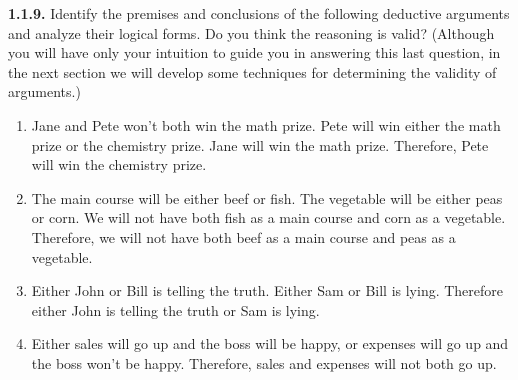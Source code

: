 \documentclass[12pt]{amsart}
\newenvironment{statement}[1]{\smallskip\noindent\color[rgb]{.6627, .3529, .6314} {\bf #1.}}{}
\theoremstyle{definition}
\theoremstyle{remark}
\begin{document}
\begin{statement}{1.1.9}
Identify the premises and conclusions of the following deductive arguments and analyze their logical forms.
Do you think the reasoning is valid?
(Although you will have only your intuition to guide you in answering this last question, in the next section we will develop some techniques for determining the validity of arguments.)
\begin{enumerate}
	\item Jane and Pete won't both win the math prize.
	Pete will win either the math prize or the chemistry prize.
	Jane will win the math prize.
	Therefore, Pete will win the chemistry prize.
	
	\item The main course will be either beef or fish.
	The vegetable will be either peas or corn.
	We will not have both fish as a main course and corn as a vegetable.
	Therefore, we will not have both beef as a main course and peas as a vegetable.
	
	\item Either John or Bill is telling the truth.
	Either Sam or Bill is lying.
	Therefore either John is telling the truth or Sam is lying.
	
	\item Either sales will go up and the boss will be happy, or expenses will go up and the boss won't be happy.
	Therefore, sales and expenses will not both go up.
\end{enumerate}
\end{statement}
\end{document}
